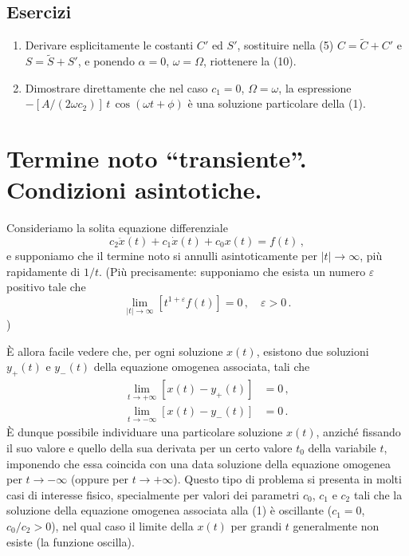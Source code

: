 \documentclass[11pt, a4paper]{book}
\numberwithin{equation}{section}
\newenvironment{esercizi}{\subsection*{Esercizi}\begin{enumerate}}{\end{enumerate}}
\begin{document}
\begin{esercizi}
    \item Derivare esplicitamente le costanti $C'$ ed $S'$, sostituire nella (5)
    $C = \tilde{C} + C'$ e $S = \tilde{S} + S'$, e ponendo $\alpha=0$, $\omega=\Omega$, riottenere
    la (10).
    \item Dimostrare direttamente che nel caso $c_1 = 0$, $\Omega = \omega$, la
    espressione $-[A/(2\omega c_2)] \, t \, \cos(\omega t + \phi)$ è una soluzione
    particolare della (1).
\end{esercizi}

\section{Termine noto ``transiente''. Condizioni asintotiche.}

Consideriamo la solita equazione differenziale
\begin{equation}
    c_2 \ddot{x}(t) + c_1 \dot{x}(t) + c_0 x(t) = f(t) \,,
\end{equation}
e supponiamo che il termine noto si annulli asintoticamente per $|t| \to \infty$,
più rapidamente di $1/t$. (Più precisamente: supponiamo che esista un numero
$\varepsilon$ positivo tale che
\begin{equation}
    \lim_{|t| \to \infty} \left[ t^{1+\varepsilon} f(t) \right] = 0 \,, \quad \varepsilon > 0 \,. \tag{2}
\end{equation}
)

È allora facile vedere che, per ogni soluzione $x(t)$, esistono due soluzioni
$y_+(t)$ e $y_-(t)$ della equazione omogenea associata, tali che
\begin{align}
    \lim_{t \to +\infty} \left[ x(t) - y_+(t) \right] &= 0 \,, \tag{3} \\
    \lim_{t \to -\infty} \left[ x(t) - y_-(t) \right] &= 0 \,. \tag{4}
\end{align}
È dunque possibile individuare una particolare soluzione $x(t)$, anziché
fissando il suo valore e quello della sua derivata per un certo valore $t_0$
della variabile $t$, imponendo che essa coincida con una data soluzione della
equazione omogenea per $t \to -\infty$ (oppure per $t \to +\infty$). Questo tipo
di problema si presenta in molti casi di interesse fisico, specialmente per
valori dei parametri $c_0$, $c_1$ e $c_2$ tali che la soluzione della equazione
omogenea associata alla (1) è oscillante ($c_1 = 0$, $c_0/c_2 > 0$), nel qual caso
il limite della $x(t)$ per grandi $t$ generalmente non esiste (la funzione oscilla).
\end{document}
